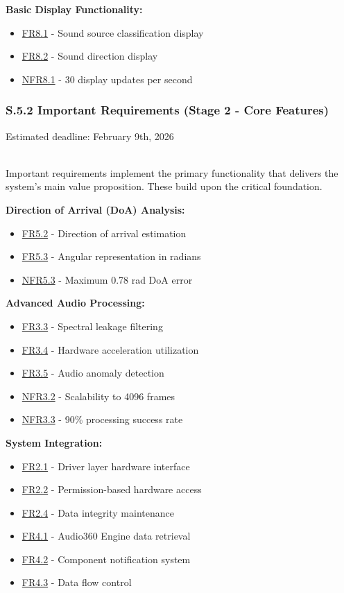 \documentclass[12pt]{article}
\theoremstyle{definition}
\begin{document}
\textbf{Basic Display Functionality:}
\begin{itemize}
    \item \hyperref[FR8_1]{FR8.1} - Sound source classification display
    \item \hyperref[FR8_2]{FR8.2} - Sound direction display
    \item \hyperref[NFR8_1]{NFR8.1} - 30 display updates per second
\end{itemize}

\subsubsection{S.5.2 Important Requirements (Stage 2 - Core Features)}

Estimated deadline: February 9th, 2026

\\

Important requirements implement the primary functionality that delivers the system's main value proposition. These build upon the critical foundation.

\textbf{Direction of Arrival (DoA) Analysis:}
\begin{itemize}
    \item \hyperref[FR5_2]{FR5.2} - Direction of arrival estimation
    \item \hyperref[FR5_3]{FR5.3} - Angular representation in radians
    \item \hyperref[NFR5_3]{NFR5.3} - Maximum 0.78 rad DoA error
\end{itemize}

\textbf{Advanced Audio Processing:}
\begin{itemize}
    \item \hyperref[FR3_3]{FR3.3} - Spectral leakage filtering
    \item \hyperref[FR3_4]{FR3.4} - Hardware acceleration utilization
    \item \hyperref[FR3_5]{FR3.5} - Audio anomaly detection
    \item \hyperref[NFR3_2]{NFR3.2} - Scalability to 4096 frames
    \item \hyperref[NFR3_3]{NFR3.3} - 90\% processing success rate
\end{itemize}

\textbf{System Integration:}
\begin{itemize}
    \item \hyperref[FR2_1]{FR2.1} - Driver layer hardware interface
    \item \hyperref[FR2_2]{FR2.2} - Permission-based hardware access
    \item \hyperref[FR2_4]{FR2.4} - Data integrity maintenance
    \item \hyperref[FR4_1]{FR4.1} - Audio360 Engine data retrieval
    \item \hyperref[FR4_2]{FR4.2} - Component notification system
    \item \hyperref[FR4_3]{FR4.3} - Data flow control
\end{itemize}
\end{document}
